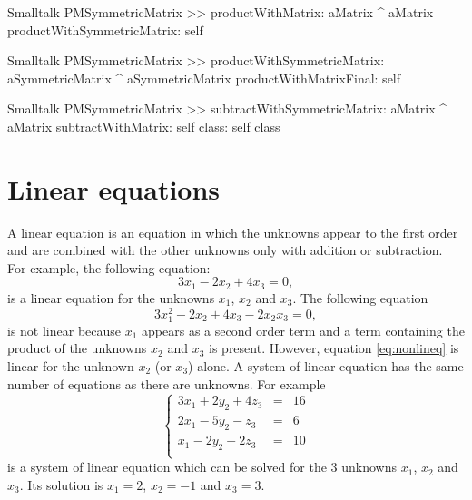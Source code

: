 \begin{displaycode}{Smalltalk}
PMSymmetricMatrix >> productWithMatrix: aMatrix
    ^ aMatrix productWithSymmetricMatrix: self
\end{displaycode}

\begin{displaycode}{Smalltalk}
PMSymmetricMatrix >> productWithSymmetricMatrix: aSymmetricMatrix
    ^ aSymmetricMatrix productWithMatrixFinal: self
\end{displaycode}

\begin{displaycode}{Smalltalk}
PMSymmetricMatrix >> subtractWithSymmetricMatrix: aMatrix
    ^ aMatrix subtractWithMatrix: self class: self class
\end{displaycode}

\section{Linear equations}
\label{sec:lineqs} A linear equation is an equation in which the
unknowns appear to the first order and are combined with the other
unknowns only with addition or subtraction. For example, the
following equation:
\begin{equation}
  3x_1-2x_2+4x_3=0,
\end{equation}
is a linear equation for the unknowns $x_1$, $x_2$ and $x_3$. The
following equation
\begin{equation}
\label{eq:nonlineq}
  3x_1^2-2x_2+4x_3 - 2 x_2 x_3=0,
\end{equation}
is not linear because $x_1$ appears as a second order term and a
term containing the product of the unknowns $x_2$ and $x_3$ is
present. However, equation \ref{eq:nonlineq} is linear for the
unknown $x_2$ (or $x_3$) alone. A system of linear equation has
the same number of equations as there are unknowns. For example
\begin{equation}
\label{eq:lineqex}
  \left\{
  \begin{array}{lcr}
  3x_1+2y_2+4z_3&=&16\\
  2x_1-5y_2-z_3&=&6\\
  x_1-2y_2-2z_3&=&10\\
\end{array}\right.
\end{equation}
is a system of linear equation which can be solved for the 3
unknowns $x_1$, $x_2$ and $x_3$. Its solution is $x_1=2$, $x_2=-1$
and $x_3=3$.

